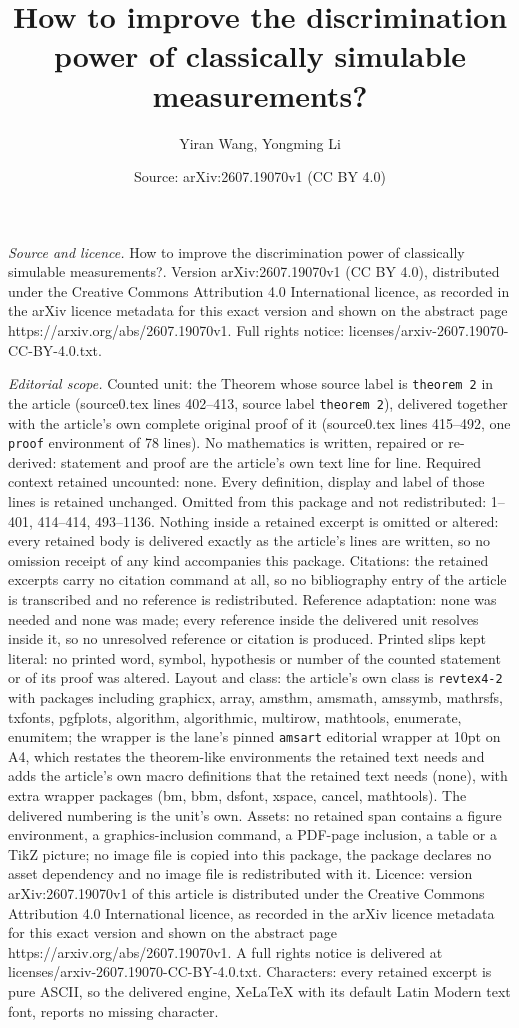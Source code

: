 \documentclass[10pt,a4paper]{amsart}
\title[How to improve the discrimination power of classically simul]{How to improve the discrimination power of classically simulable measurements?}
\author{Yiran Wang, Yongming Li}
\date{Source: arXiv:2607.19070v1 (CC BY 4.0)}
\begin{document}
\maketitle

\noindent\emph{Source and licence.} How to improve the discrimination power of classically simulable measurements?. Version arXiv:2607.19070v1 (CC BY 4.0), distributed under the Creative Commons Attribution 4.0 International licence, as recorded in the arXiv licence metadata for this exact version and shown on the abstract page https://arxiv.org/abs/2607.19070v1. Full rights notice: licenses/arxiv-2607.19070-CC-BY-4.0.txt.\par\smallskip

\noindent\textit{Editorial scope.} Counted unit: the Theorem whose source label is \texttt{theorem 2} in the article (source0.tex lines 402--413, source label \texttt{theorem 2}), delivered together with the article's own complete original proof of it (source0.tex lines 415--492, one \texttt{proof} environment of 78 lines). No mathematics is written, repaired or re-derived: statement and proof are the article's own text line for line. Required context retained uncounted: none. Every definition, display and label of those lines is retained unchanged. Omitted from this package and not redistributed: 1--401, 414--414, 493--1136. Nothing inside a retained excerpt is omitted or altered: every retained body is delivered exactly as the article's lines are written, so no omission receipt of any kind accompanies this package. Citations: the retained excerpts carry no citation command at all, so no bibliography entry of the article is transcribed and no reference is redistributed. Reference adaptation: none was needed and none was made; every reference inside the delivered unit resolves inside it, so no unresolved reference or citation is produced. Printed slips kept literal: no printed word, symbol, hypothesis or number of the counted statement or of its proof was altered. Layout and class: the article's own class is \texttt{revtex4-2} with packages including graphicx, array, amsthm, amsmath, amssymb, mathrsfs, txfonts, pgfplots, algorithm, algorithmic, multirow, mathtools, enumerate, enumitem; the wrapper is the lane's pinned \texttt{amsart} editorial wrapper at 10pt on A4, which restates the theorem-like environments the retained text needs and adds the article's own macro definitions that the retained text needs (none), with extra wrapper packages (bm, bbm, dsfont, xspace, cancel, mathtools). The delivered numbering is the unit's own. Assets: no retained span contains a figure environment, a graphics-inclusion command, a PDF-page inclusion, a table or a TikZ picture; no image file is copied into this package, the package declares no asset dependency and no image file is redistributed with it. Licence: version arXiv:2607.19070v1 of this article is distributed under the Creative Commons Attribution 4.0 International licence, as recorded in the arXiv licence metadata for this exact version and shown on the abstract page https://arxiv.org/abs/2607.19070v1. A full rights notice is delivered at licenses/arxiv-2607.19070-CC-BY-4.0.txt. Characters: every retained excerpt is pure ASCII, so the delivered engine, XeLaTeX with its default Latin Modern text font, reports no missing character.
\end{document}

